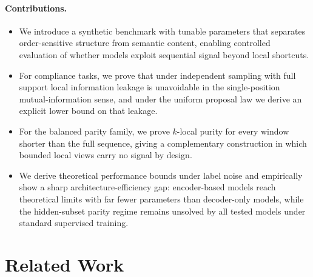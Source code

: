 \documentclass{article}
\theoremstyle{plain}
\theoremstyle{definition}
\theoremstyle{remark}
\begin{document}
\paragraph{Contributions.}
\begin{itemize}
    \item We introduce a synthetic benchmark with tunable parameters that separates order-sensitive structure from semantic content, enabling controlled evaluation of whether models exploit sequential signal beyond local shortcuts.
    \item For compliance tasks, we prove that under independent sampling with full support local information leakage is unavoidable in the single-position mutual-information sense, and under the uniform proposal law we derive an explicit lower bound on that leakage.
    \item For the balanced parity family, we prove $k$-local purity for every window shorter than the full sequence, giving a complementary construction in which bounded local views carry no signal by design.
    \item We derive theoretical performance bounds under label noise and empirically show a sharp architecture-efficiency gap: encoder-based models reach theoretical limits with far fewer parameters than decoder-only models, while the hidden-subset parity regime remains unsolved by all tested models under standard supervised training.
\end{itemize}

\section{Related Work}
\label{sec:related_work}
\end{document}
